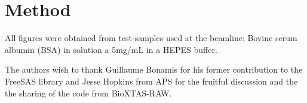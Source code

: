 \documentclass[preprint]{iucr}              %
\begin{document}
\appendix
\section{Method}

All figures were obtained from test-samples used at the beamline: Bovine serum albumin (BSA) in solution a 5mg/mL in a HEPES buffer.

The authors wish to thank Guillaume Bonamis for his former contribution to the FreeSAS library and Jesse Hopkins from APS for the fruitful discussion and the the sharing of the code from BioXTAS-RAW.




\end{document}
